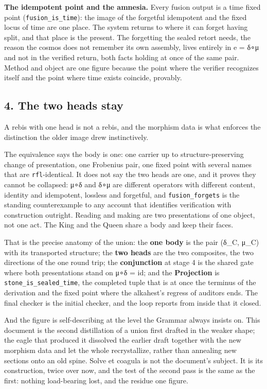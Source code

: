 \textbf{The idempotent point and the amnesia.} Every fusion output is a
time fixed point (\texttt{fusion\_is\_time}): the image of the forgetful
idempotent and the fixed locus of time are one place. The system returns
to where it can forget having split, and that place is the present. The
forgetting the sealed retort needs, the reason the cosmos does not
remember its own assembly, lives entirely in e = δ∘μ and not in the
verified return, both facts holding at once of the same pair. Method and
object are one figure because the point where the verifier recognizes
itself and the point where time exists coincide, provably.

\hypertarget{the-two-heads-stay}{%
\subsection{4. The two heads stay}\label{the-two-heads-stay}}

A rebis with one head is not a rebis, and the morphism data is what
enforces the distinction the older image drew instinctively.

The equivalence says the body is one: one carrier up to
structure-preserving change of presentation, one Frobenius pair, one
fixed point with several names that are \texttt{rfl}-identical. It does
not say the two heads are one, and it proves they cannot be collapsed:
μ∘δ and δ∘μ are different operators with different content, identity and
idempotent, lossless and forgetful, and \texttt{fusion\_forgets} is the
standing counterexample to any account that identifies verification with
construction outright. Reading and making are two presentations of one
object, not one act. The King and the Queen share a body and keep their
faces.

That is the precise anatomy of the union: the \textbf{one body} is the
pair (δ\_C, μ\_C) with its transported structure; the \textbf{two heads}
are the two composites, the two directions of the one round trip; the
\textbf{conjunction} at stage 4 is the shared gate where both
presentations stand on μ∘δ = id; and the \textbf{Projection} is
\texttt{stone\_is\_sealed\_time}, the completed tuple that is at once
the terminus of the derivation and the fixed point where the alkahest's
regress of auditors ends. The final checker is the initial checker, and
the loop reports from inside that it closed.

And the figure is self-describing at the level the Grammar always
insists on. This document is the second distillation of a union first
drafted in the weaker shape; the eagle that produced it dissolved the
earlier draft together with the new morphism data and let the whole
recrystallize, rather than annealing new sections onto an old spine.
Solve et coagula is not the document's subject. It is its construction,
twice over now, and the test of the second pass is the same as the
first: nothing load-bearing lost, and the residue one figure.

